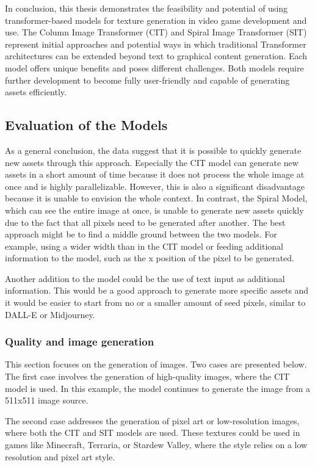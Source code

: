 
    In conclusion, this thesis demonstrates the feasibility and potential of using transformer-based models for texture generation in video game development and use. The Column Image Transformer (CIT) and Spiral Image Transformer (SIT) represent initial approaches and potential ways in which traditional Transformer architectures can be extended beyond text to graphical content generation. Each model offers unique benefits and poses different challenges. Both models require further development to become fully user-friendly and capable of generating assets efficiently.

\subsection{Evaluation of the Models}

    As a general conclusion, the data suggest that it is possible to quickly generate new assets through this approach. Especially the CIT model can generate new assets in a short amount of time because it does not process the whole image at once and is highly parallelizable. However, this is also a significant disadvantage because it is unable to envision the whole context. In contrast, the Spiral Model, which can see the entire image at once, is unable to generate new assets quickly due to the fact that all pixels need to be generated after another. The best approach might be to find a middle ground between the two models. For example, using a wider width than in the CIT model or feeding additional information to the model, such as the x position of the pixel to be generated.

    Another addition to the model could be the use of text input as additional information. This would be a good approach to generate more specific assets and it would be easier to start from no or a smaller amount of seed pixels, similar to DALL-E or Midjourney.

    \subsubsection{Quality and image generation}
    This section focuses on the generation of images. Two cases are presented below. The first case involves the generation of high-quality images, where the CIT model is used. In this example, the model continues to generate the image from a 511x511 image source.
    
    The second case addresses the generation of pixel art or low-resolution images, where both the CIT and SIT models are used. These textures could be used in games like Minecraft, Terraria, or Stardew Valley, where the style relies on a low resolution and pixel art style.

